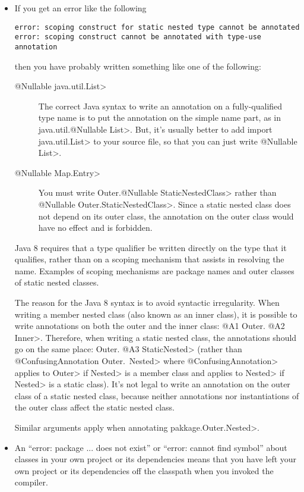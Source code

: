 \begin{itemize}

\item
If you get an error like the following

\begin{Verbatim}
error: scoping construct for static nested type cannot be annotated
error: scoping construct cannot be annotated with type-use annotation
\end{Verbatim}

\noindent
  then you have probably written something like one of the following:
\begin{description}
\item[\<@Nullable java.util.List>]
The correct Java syntax to write an annotation on a fully-qualified type
name is to put the annotation on the simple name part, as in
\<java.util.@Nullable List>.  But, it's usually
better to add \<import java.util.List> to your source file, so that you can
just write \<@Nullable List>.
\item[\<@Nullable Map.Entry>]  You must write \<Outer.@Nullable
StaticNestedClass> rather than \<@Nullable Outer.StaticNestedClass>.
Since a static nested class does not depend on its outer class, the
annotation on the outer class would have no effect and is forbidden.
\end{description}

Java 8 requires that a type qualifier be written directly on the type that
it qualifies, rather than on a scoping mechanism that assists in resolving
the name.  Examples of scoping mechanisms are package names and outer
classes of static nested classes.

The reason for the Java 8 syntax is to avoid syntactic irregularity.  When
writing a member nested class (also known as an inner class), it is
possible to write annotations on both the outer and the inner class:  \<@A1
Outer. @A2 Inner>.  Therefore, when writing a static nested class, the
annotations should go on the same place:  \<Outer. @A3 StaticNested> (rather
than \<@ConfusingAnnotation Outer.\ Nested> where
\<@ConfusingAnnotation> applies to \<Outer> if \<Nested> is a member class
and applies to \<Nested> if \<Nested> is a static class).  It's not legal
to write an annotation on the outer class of a static nested class, because
neither annotations nor instantiations of the outer class affect the static
nested class.

Similar arguments apply when annotating \<pakkage.Outer.Nested>.

\item
An ``error: package ... does not exist'' or ``error: cannot find symbol''
about classes in your own project or its dependencies means that you have
left your own project or its dependencies off the classpath when you
invoked the compiler.

\end{itemize}


